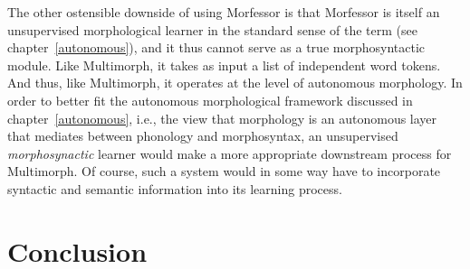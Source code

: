 The other ostensible downside of using Morfessor is that 
Morfessor is itself an unsupervised morphological learner in the 
standard sense of the term (see chapter~\ref{autonomous}), 
and it thus cannot serve as a true morphosyntactic module.
Like Multimorph, it takes as input a list of independent word tokens.
And thus, like Multimorph, it operates at the level of autonomous morphology. 
In order to better fit the autonomous morphological framework discussed in chapter~\ref{autonomous}, i.e., the view that morphology is an autonomous layer that mediates between phonology and morphosyntax, an unsupervised  %
\emph{morphosynactic} learner would make a more appropriate downstream process for Multimorph. 
Of course, such a system would in some way have to incorporate syntactic and semantic information into its learning process.


\section{Conclusion}
\label{sec:concl-overall}
% 
%

